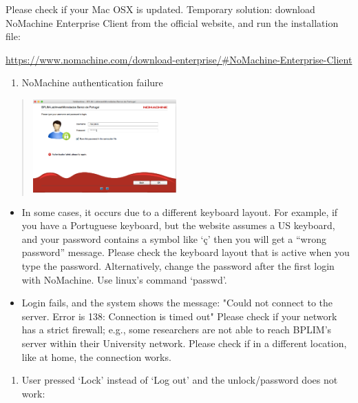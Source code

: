 \documentclass[
  11pt,
  a4paper,
]{article}
\providecommand{\tightlist}{%
  \setlength{\itemsep}{0pt}\setlength{\parskip}{0pt}}
\begin{document}
Please check if your Mac OSX is updated. Temporary solution: download
NoMachine Enterprise Client from the official website, and run the
installation file:

\url{https://www.nomachine.com/download-enterprise/\#NoMachine-Enterprise-Client}

\begin{enumerate}
\def\labelenumi{\arabic{enumi}.}
\setcounter{enumi}{1}
\tightlist
\item
  NoMachine authentication failure
\end{enumerate}

\begin{quote}
\includegraphics[width=2.16535in,height=1.40773in]{./media/image46.png}
\end{quote}

\begin{itemize}
\item
  In some cases, it occurs due to a different keyboard layout. For
  example, if you have a Portuguese keyboard, but the website assumes a
  US keyboard, and your password contains a symbol like `ç' then you
  will get a ``wrong password'' message. Please check the keyboard
  layout that is active when you type the password. Alternatively,
  change the password after the first login with NoMachine. Use linux's
  command `passwd'.
\item
  Login fails, and the system shows the message: "Could not connect to
  the server. Error is 138: Connection is timed out" Please check if
  your network has a strict firewall; e.g., some researchers are not
  able to reach BPLIM's server within their University network. Please
  check if in a different location, like at home, the connection works.
\end{itemize}

\begin{enumerate}
\def\labelenumi{\arabic{enumi}.}
\setcounter{enumi}{2}
\tightlist
\item
  User pressed `Lock' instead of `Log out' and the unlock/password does
  not work:
\end{enumerate}
\end{document}

